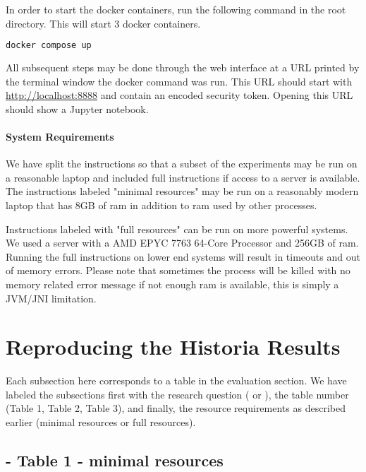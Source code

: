 \documentclass{acmart} %
\begin{document}
In order to start the docker containers, run the following command in the root directory.  This will start 3 docker containers.

\begin{lstlisting}[language=bash]
    docker compose up
\end{lstlisting}

All subsequent steps may be done through the web interface at a URL printed by the terminal window the docker command was run. This URL should start with \url{http://localhost:8888} and contain an encoded security token.  Opening this URL should show a Jupyter notebook.


\paragraph{System Requirements} 
We have split the instructions so that a subset of the experiments may be run on a reasonable laptop and included full instructions if access to a server is available.
The instructions labeled "minimal resources" may be run on a reasonably modern laptop that has 8GB of ram in addition to ram used by other processes. 

Instructions labeled with "full resources" can be run on more powerful systems.  We used a server with a AMD EPYC 7763 64-Core Processor and 256GB of ram.  Running the full instructions on lower end systems will result in timeouts and out of memory errors.  Please note that sometimes the process will be killed with no memory related error message if not enough ram is available, this is simply a JVM/JNI limitation.


\section{Reproducing the Historia Results}

Each subsection here corresponds to a table in the evaluation section.  We have labeled the subsections first with the research question ( or ), the table number (Table 1, Table 2, Table 3), and finally, the resource requirements as described earlier (minimal resources or full resources).

\subsection{ - Table 1 - minimal resources}
\end{document}
